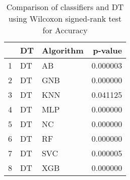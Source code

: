 \begin{table}
\footnotesize
\caption{Comparison of classifiers and DT using Wilcoxon signed-rank test for Accuracy}
\label{tab:DT wilcoxon Accuracy comparison}
\begin{tabular}{lllr}
\hline
 & DT & Algorithm & p-value \\
\hline
1 & DT & AB & 0.000003 \\
2 & DT & GNB & 0.000000 \\
3 & DT & KNN & 0.041125 \\
4 & DT & MLP & 0.000000 \\
5 & DT & NC & 0.000000 \\
6 & DT & RF & 0.000000 \\
7 & DT & SVC & 0.000005 \\
8 & DT & XGB & 0.000000 \\
\hline
\end{tabular}
\end{table}
